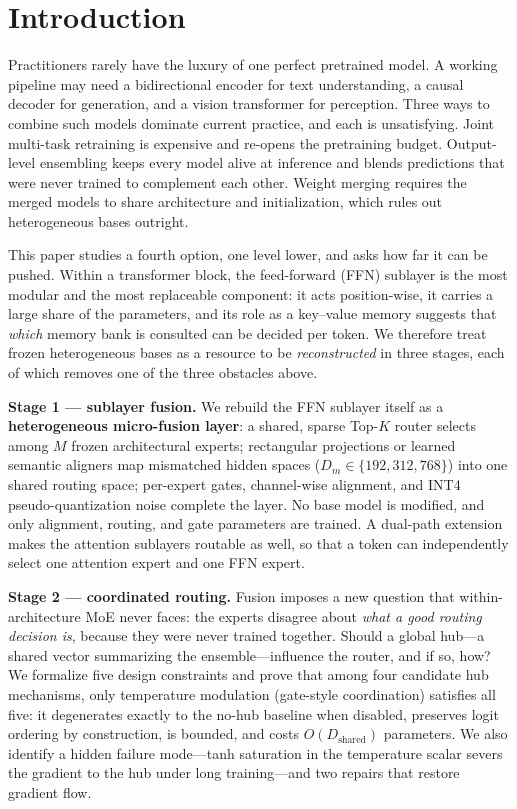 \documentclass[10pt,twoside]{article}
\theoremstyle{definition}
\theoremstyle{plain}
\theoremstyle{remark}
\begin{document}
\section{Introduction}
\label{sec:intro}

Practitioners rarely have the luxury of one perfect pretrained model. A working pipeline may need a bidirectional encoder for text understanding, a causal decoder for generation, and a vision transformer for perception. Three ways to combine such models dominate current practice, and each is unsatisfying. Joint multi-task retraining is expensive and re-opens the pretraining budget. Output-level ensembling keeps every model alive at inference and blends predictions that were never trained to complement each other. Weight merging \citep{ilharco2023,yadav2023,wortsman2022} requires the merged models to share architecture and initialization, which rules out heterogeneous bases outright.

This paper studies a fourth option, one level lower, and asks how far it can be pushed. Within a transformer block, the feed-forward (FFN) sublayer is the most modular and the most replaceable component: it acts position-wise, it carries a large share of the parameters, and its role as a key--value memory \citep{geva2021} suggests that \emph{which} memory bank is consulted can be decided per token. We therefore treat frozen heterogeneous bases as a resource to be \emph{reconstructed} in three stages, each of which removes one of the three obstacles above.

\textbf{Stage 1 --- sublayer fusion.} We rebuild the FFN sublayer itself as a \textbf{heterogeneous micro-fusion layer}: a shared, sparse Top-$K$ router selects among $M$ frozen architectural experts; rectangular projections or learned semantic aligners map mismatched hidden spaces ($D_m \in \{192, 312, 768\}$) into one shared routing space; per-expert gates, channel-wise alignment, and INT4 pseudo-quantization noise complete the layer. No base model is modified, and only alignment, routing, and gate parameters are trained. A dual-path extension makes the attention sublayers routable as well, so that a token can independently select one attention expert and one FFN expert.

\textbf{Stage 2 --- coordinated routing.} Fusion imposes a new question that within-architecture MoE never faces: the experts disagree about \emph{what a good routing decision is}, because they were never trained together. Should a global hub---a shared vector summarizing the ensemble---influence the router, and if so, how? We formalize five design constraints and prove that among four candidate hub mechanisms, only temperature modulation (gate-style coordination) satisfies all five: it degenerates exactly to the no-hub baseline when disabled, preserves logit ordering by construction, is bounded, and costs $O(D_{\text{shared}})$ parameters. We also identify a hidden failure mode---tanh saturation in the temperature scalar severs the gradient to the hub under long training---and two repairs that restore gradient flow.
\end{document}

